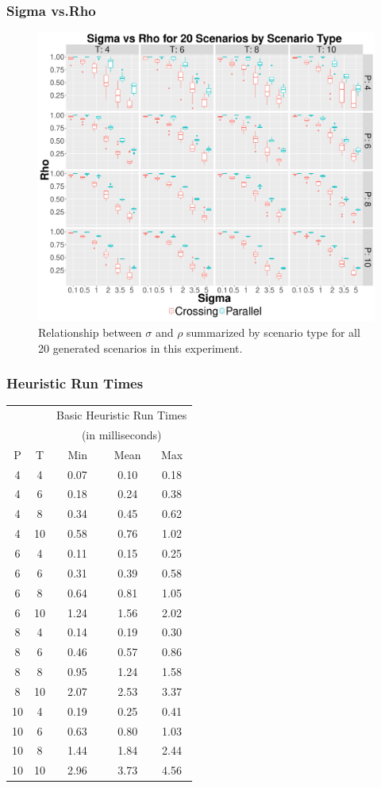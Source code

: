 \documentclass{beamer}
\begin{document}
\begin{frame}
\frametitle{Sigma vs.Rho} 
\begin{figure}[ht]
  \centering
  \includegraphics[width=.7\columnwidth]{../Figures//Sigma_vs_Rho}
    \caption{Relationship between $\sigma$ and $\rho$ summarized by scenario type for all 20 generated scenarios in this experiment.}
    \label{fig:Sigma_vs_Rho}
\end{figure}
\end{frame}


\begin{frame}
\frametitle{Heuristic Run Times}
\begin{table}\tiny
\centering
\begin{tabular}{cc|ccc}
  \hline
   & & \multicolumn{3}{c}{Basic Heuristic Run Times } \\
   & & \multicolumn{3}{c}{(in milliseconds)}\\
   P & T & $\;\;$Min$\:\;$ & Mean & Max \\ 
  \hline
  \hline
   4 & 4 & 0.07 & 0.10 & 0.18 \\ 
   4 & 6 & 0.18 & 0.24 & 0.38 \\ 
   4 & 8 & 0.34 & 0.45 & 0.62 \\ 
   4 & 10 & 0.58 & 0.76 & 1.02 \\ 
   6 & 4 & 0.11 & 0.15 & 0.25 \\ 
   6 & 6 & 0.31 & 0.39 & 0.58 \\ 
   6 & 8 & 0.64 & 0.81 & 1.05 \\ 
   6 & 10 & 1.24 & 1.56 & 2.02 \\ 
   8 & 4 & 0.14 & 0.19 & 0.30 \\ 
   8 & 6 & 0.46 & 0.57 & 0.86 \\ 
   8 & 8 & 0.95 & 1.24 & 1.58 \\ 
   8 & 10 & 2.07 & 2.53 & 3.37 \\ 
   10 & 4 & 0.19 & 0.25 & 0.41 \\ 
   10 & 6 & 0.63 & 0.80 & 1.03 \\ 
   10 & 8 & 1.44 & 1.84 & 2.44 \\ 
   10 & 10 & 2.96 & 3.73 & 4.56 \\ 
   \hline
\end{tabular}
\end{table}
\end{frame}
\end{document}
